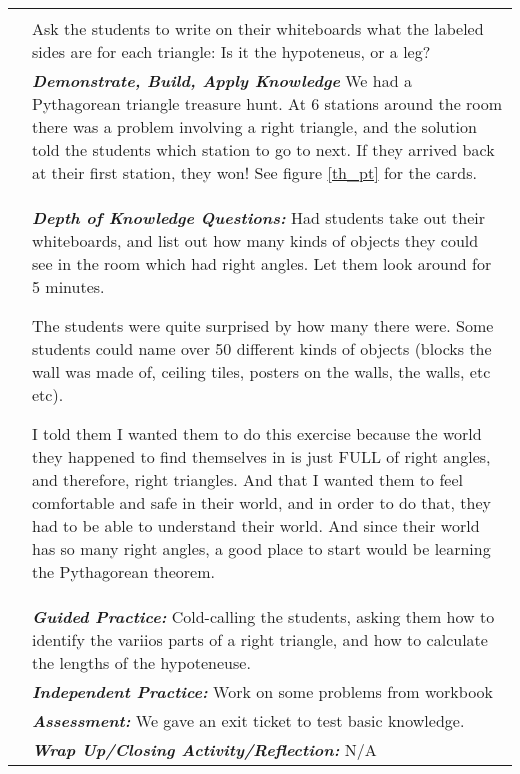 \begin{tabularx}{\textwidth}{|p{0.5in}|X|}
\begin{tikzpicture}[scale=0.9]
  \end{tikzpicture}  \\

  & Ask the students to write on their whiteboards what the labeled
  sides are for each triangle: Is it the hypoteneus, or a leg? \\
  
  \hline
  
  \textbf{} &

  \textbf{\em Demonstrate, Build, Apply Knowledge} We had a Pythagorean triangle treasure hunt.  At 6 stations around the room there was a problem involving a right triangle, and the solution told the students which station to go to next.  If they arrived back at their first station, they won!  See figure \ref{th_pt} for the cards.\\
  
  \hline
  
  \textbf{} & \textbf{\em Depth of Knowledge Questions:} Had students take out their whiteboards, and list out how many kinds of objects they could see in the room which had right angles.  Let them look around for 5 minutes.

  The students were quite surprised by how many there were.   Some students could name over 50 different kinds of objects (blocks the wall was made of, ceiling tiles, posters on the walls, the walls, etc etc).

  I told them I wanted them to do this exercise because the world they happened to find themselves in is just FULL of right angles, and therefore, right triangles.  And that I wanted them to feel comfortable and safe in their world, and in order to do that, they had to be able to understand their world.   And since their world has so many right angles, a good place to start would be learning the Pythagorean theorem.\\
  
  \hline
  
  \textbf{} & \textbf{\em Guided Practice:} Cold-calling the students, asking them how to identify the variios parts of a right triangle, and how to calculate the lengths of the hypoteneuse.\\
  
  \hline
  
  \textbf{} & \textbf{\em Independent Practice:} Work on some problems from workbook  \\
  
  \hline

  \textbf{} & \textbf{\em Assessment:} We gave an exit ticket to test basic knowledge.\\
  \hline
  
  \textbf{} & \textbf{\em Wrap Up/Closing Activity/Reflection:} N/A\\
  
  \hline
\end{tabularx}
  
